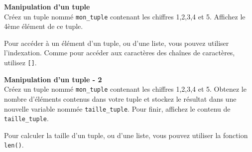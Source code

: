     \begin{Exercice}[5 minutes] \textbf{Manipulation d'un tuple}\\
        Créez un tuple nommé \lstinline{mon_tuple} contenant les chiffres 1,2,3,4 et 5. Affichez le 4ème élément de ce tuple.
    
        \begin{conseil}
            Pour accéder à un élément d'un tuple, ou d'une liste, vous pouvez utiliser l'indexation. Comme pour accéder aux caractères des chaînes de caractères, utilisez \lstinline{[]}.
        \end{conseil}
        
        \begin{solution}
             
        \end{solution}
    \end{Exercice}

    \begin{Exercice}[5 minutes] \textbf{Manipulation d'un tuple - 2}\\
        Créez un tuple nommé \lstinline{mon_tuple} contenant les chiffres 1,2,3,4 et 5. Obtenez le nombre d'éléments contenus dans votre tuple et stockez le résultat dans une nouvelle variable nommée \lstinline{taille_tuple}. Pour finir, affichez le contenu de \lstinline{taille_tuple}.
    
        \begin{conseil}
            Pour calculer la taille d'un tuple, ou d'une liste, vous pouvez utiliser la fonction \lstinline{len()}.
        \end{conseil}
        
        \begin{solution}
             
        \end{solution}
    \end{Exercice}
    
